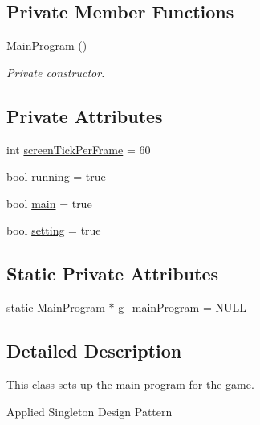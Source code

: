 \subsection*{Private Member Functions}
\begin{DoxyCompactItemize}
\item 
\mbox{\label{class_main_program_a2d2c26f36b553e3c7280acd5ce749050}} 
\mbox{\hyperlink{class_main_program_a2d2c26f36b553e3c7280acd5ce749050}{Main\+Program}} ()
\begin{DoxyCompactList}\small\item\em Private constructor. \end{DoxyCompactList}\end{DoxyCompactItemize}
\subsection*{Private Attributes}
\begin{DoxyCompactItemize}
\item 
int \mbox{\hyperlink{class_main_program_a25306ce69d9242d1c58cb3c6b544dc77}{screen\+Tick\+Per\+Frame}} = 60
\item 
bool \mbox{\hyperlink{class_main_program_a8b9e8adca1e722385badbef5b10c5283}{running}} = true
\item 
bool \mbox{\hyperlink{class_main_program_ad7aa4b0bb971b97840157b0fba811d82}{main}} = true
\item 
bool \mbox{\hyperlink{class_main_program_ae32c52912be971caaadf9a0b5d2c31cf}{setting}} = true
\end{DoxyCompactItemize}
\subsection*{Static Private Attributes}
\begin{DoxyCompactItemize}
\item 
static \mbox{\hyperlink{class_main_program}{Main\+Program}} $\ast$ \mbox{\hyperlink{class_main_program_ac1500b2f4a7567e7f91f19241239f54f}{g\+\_\+main\+Program}} = N\+U\+LL
\end{DoxyCompactItemize}


\subsection{Detailed Description}
This class sets up the main program for the game. 

Applied Singleton Design Pattern 

